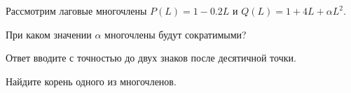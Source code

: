 
\begin{question}
Рассмотрим лаговые многочлены \(P(L) = 1 - 0.2 L\) и \(Q(L) = 1 + 4 L + \alpha L^2\).

При каком значении \(\alpha\) многочлены будут сократимыми?

Ответ вводите с точностью до двух знаков после десятичной точки.
\end{question}

\begin{solution}
Найдите корень одного из многочленов.
\end{solution}

